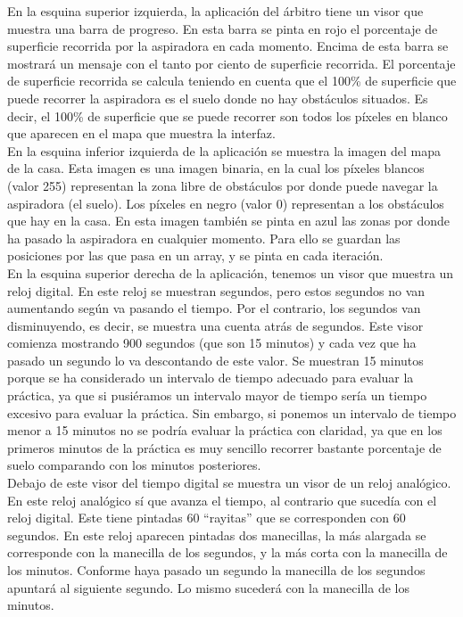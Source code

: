 En la esquina superior izquierda, la aplicación del árbitro tiene un visor que muestra una barra de progreso. En esta barra se pinta en rojo el porcentaje de superficie recorrida por la aspiradora en cada momento. Encima de esta barra se mostrará un mensaje con el tanto por ciento de superficie recorrida. El porcentaje de superficie recorrida se calcula teniendo en cuenta que el 100\% de superficie que puede recorrer la aspiradora es el suelo donde no hay obstáculos situados. Es decir, el 100\% de superficie que se puede recorrer son todos los píxeles en blanco que aparecen en el mapa que muestra la interfaz.\\

En la esquina inferior izquierda de la aplicación se muestra la imagen del mapa de la casa. Esta imagen es una imagen binaria, en la cual los píxeles blancos (valor 255) representan la zona libre de obstáculos por donde puede navegar la aspiradora (el suelo). Los píxeles en negro (valor 0) representan a los obstáculos que hay en la casa. En esta imagen también se pinta en azul las zonas por donde ha pasado la aspiradora en cualquier momento. Para ello se guardan las posiciones por las que pasa en un array, y se pinta en cada iteración.\\

En la esquina superior derecha de la aplicación, tenemos un visor que muestra un reloj digital. En este reloj se muestran segundos, pero estos segundos no van aumentando según va pasando el tiempo. Por el contrario, los segundos van disminuyendo, es decir, se muestra una cuenta atrás de segundos. Este visor comienza mostrando 900 segundos (que son 15 minutos) y cada vez que ha pasado un segundo lo va descontando de este valor. Se muestran 15 minutos porque se ha considerado un intervalo de tiempo adecuado para evaluar la práctica, ya que si pusiéramos un intervalo mayor de tiempo sería un tiempo excesivo para evaluar la práctica. Sin embargo, si ponemos un intervalo de tiempo menor a 15 minutos no se podría evaluar la práctica con claridad, ya que en los primeros minutos de la práctica es muy sencillo recorrer bastante porcentaje de suelo comparando con los minutos posteriores.\\

Debajo de este visor del tiempo digital se muestra un visor de un reloj analógico. En este reloj analógico sí que avanza el tiempo, al contrario que sucedía con el reloj digital. Este tiene pintadas 60 “rayitas” que se corresponden con 60 segundos. En este reloj aparecen pintadas dos manecillas, la más alargada se corresponde con la manecilla de los segundos, y la más corta con la manecilla de los minutos. Conforme haya pasado un segundo la manecilla de los segundos apuntará al siguiente segundo. Lo mismo sucederá con la manecilla de los minutos.\\

